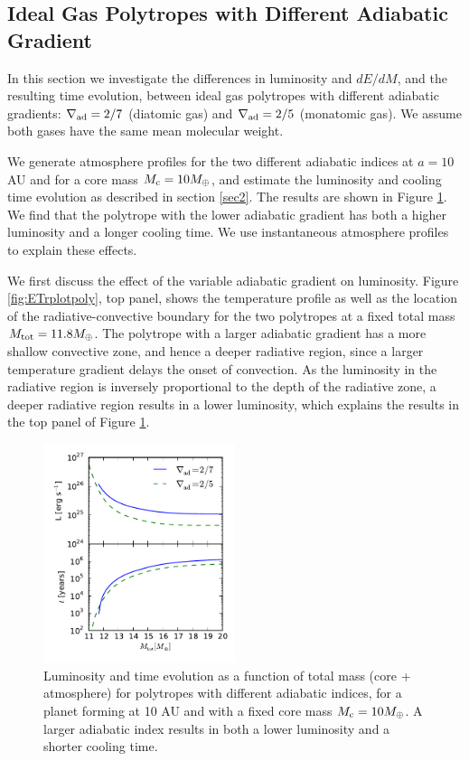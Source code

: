 \documentclass[apj]{emulateapj}
\newcommand{\delad}{\nabla_{\rm ad}}
\begin{document}
\subsection{Ideal Gas Polytropes with Different Adiabatic Gradient}
\label{deladpoly}

In this section we investigate the differences in luminosity and $dE/dM$, and the resulting time evolution, between ideal gas polytropes with different adiabatic gradients: $\delad=2/7$ (diatomic gas) and $\delad=2/5$ (monatomic gas). We assume both gases have the same mean molecular weight. %

We generate atmosphere profiles for the two different adiabatic indices at $a=10$ AU and for a core mass $M_{\rm c}=10 M_{\oplus}$, and estimate the luminosity and cooling time evolution as described in section \ref{sec2}. The results are shown in Figure \ref{fig:Ltplotpoly}. We find that the polytrope with the lower adiabatic gradient has both a higher luminosity and a longer cooling time. We use instantaneous atmosphere profiles to explain these effects. 

We first discuss the effect of the variable adiabatic gradient on luminosity. Figure \ref{fig:ETrplotpoly}, top panel, shows the temperature profile as well as the location of the radiative-convective boundary for the two polytropes at a fixed total mass $M_{\rm{tot}}=11.8 M_{\oplus}$. The polytrope with a larger adiabatic gradient has a more shallow convective zone, and hence a deeper radiative region, since a larger temperature gradient delays the onset of convection. As the luminosity in the radiative region is inversely proportional to the depth of the radiative zone, a deeper radiative region results in a lower luminosity, which explains the results in the top panel of Figure \ref{fig:Ltplotpoly}. 

\begin{figure}[h]
\centering
\includegraphics[width=0.5\textwidth]{../../figs/ModelAtmospheres/RadSelfGravRealEOS/EOSeffects/Ltplot_poly.pdf}
\caption{Luminosity and time evolution as a function of total mass (core + atmosphere) for polytropes with different adiabatic indices, for a planet forming at 10 AU and with a fixed core mass $M_{\rm c}=10 M_{\oplus}$. A larger adiabatic index results in both a lower luminosity and a shorter cooling time.}
\label{fig:Ltplotpoly}
\end{figure}
\end{document}
